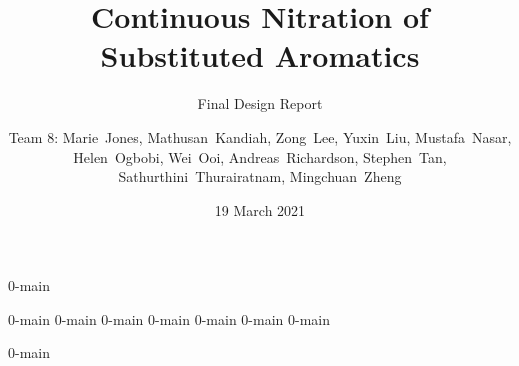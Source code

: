\documentclass{nitroma-report}
\subtitle{Final Design Report}
\title{Continuous Nitration of Substituted Aromatics}
\author{Team 8: Marie~Jones, Mathusan~Kandiah, Zong~Lee, Yuxin~Liu, Mustafa~Nasar, Helen~Ogbobi, Wei~Ooi, Andreas~Richardson, Stephen~Tan, Sathurthini~Thurairatnam, Mingchuan~Zheng}
\date{19 March 2021}
\begin{document}
\frontmatter
\maketitle

{0-main}

\tableofcontents

\mainmatter
{0-main}
{0-main}
{0-main}
{0-main}
{0-main}
{0-main}
{0-main}

\begin{appendices}
    {0-main}
\end{appendices}
\end{document}
